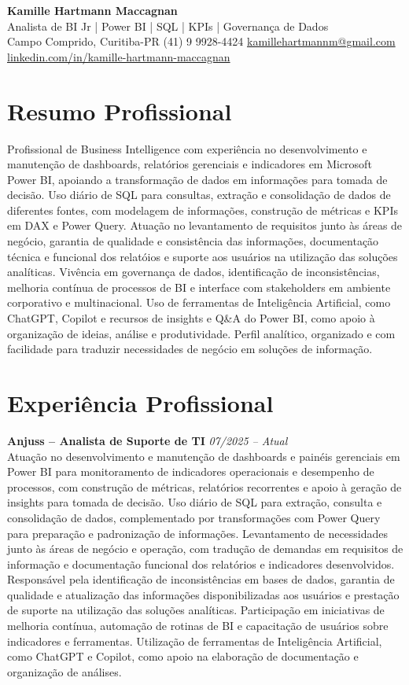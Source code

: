 \documentclass[11pt,a4paper]{article}
\newcommand{\cvheader}[4]{%
  \begin{center}
    {\LARGE\bfseries #1}\\[4pt]
    {\large #2}\\[6pt]
    #3\\[2pt]
    #4
  \end{center}
  \vspace{4pt}
}
\newcommand{\experience}[3]{%
  \textbf{#1} \hfill \textit{#2}\\[4pt]
  #3
  \vspace{8pt}
}
\begin{document}
\cvheader{Kamille Hartmann Maccagnan}%
{Analista de BI Jr | Power BI | SQL | KPIs | Governança de Dados}%
{Campo Comprido, Curitiba-PR \textbullet{} (41) 9 9928-4424 \textbullet{} \href{mailto:kamillehartmannm@gmail.com}{kamillehartmannm@gmail.com}}%
{\href{https://linkedin.com/in/kamille-hartmann-maccagnan/}{linkedin.com/in/kamille-hartmann-maccagnan}}

\section*{Resumo Profissional}

Profissional de Business Intelligence com experiência no desenvolvimento e manutenção de dashboards, relatórios gerenciais e indicadores em Microsoft Power BI, apoiando a transformação de dados em informações para tomada de decisão. Uso diário de SQL para consultas, extração e consolidação de dados de diferentes fontes, com modelagem de informações, construção de métricas e KPIs em DAX e Power Query. Atuação no levantamento de requisitos junto às áreas de negócio, garantia de qualidade e consistência das informações, documentação técnica e funcional dos relatóios e suporte aos usuários na utilização das soluções analíticas. Vivência em governança de dados, identificação de inconsistências, melhoria contínua de processos de BI e interface com stakeholders em ambiente corporativo e multinacional. Uso de ferramentas de Inteligência Artificial, como ChatGPT, Copilot e recursos de insights e Q\&A do Power BI, como apoio à organização de ideias, análise e produtividade. Perfil analítico, organizado e com facilidade para traduzir necessidades de negócio em soluções de informação.

\section*{Experiência Profissional}

\experience{Anjuss -- Analista de Suporte de TI}{07/2025 -- Atual}{%
Atuação no desenvolvimento e manutenção de dashboards e painéis gerenciais em Power BI para monitoramento de indicadores operacionais e desempenho de processos, com construção de métricas, relatórios recorrentes e apoio à geração de insights para tomada de decisão. Uso diário de SQL para extração, consulta e consolidação de dados, complementado por transformações com Power Query para preparação e padronização de informações. Levantamento de necessidades junto às áreas de negócio e operação, com tradução de demandas em requisitos de informação e documentação funcional dos relatórios e indicadores desenvolvidos. Responsável pela identificação de inconsistências em bases de dados, garantia de qualidade e atualização das informações disponibilizadas aos usuários e prestação de suporte na utilização das soluções analíticas. Participação em iniciativas de melhoria contínua, automação de rotinas de BI e capacitação de usuários sobre indicadores e ferramentas. Utilização de ferramentas de Inteligência Artificial, como ChatGPT e Copilot, como apoio na elaboração de documentação e organização de análises.}
\end{document}
